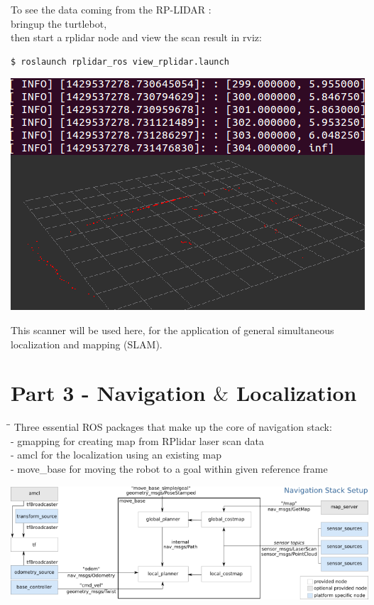 \documentclass[10pt,a4paper]{article}
\begin{document}
To see the data coming from the RP-LIDAR :\\
bringup the turtlebot, \\
then start a rplidar node and view the scan result in rviz:
\begin{lstlisting}[frame=single] 
$ roslaunch rplidar_ros view_rplidar.launch
\end{lstlisting}

\begin{center}
\includegraphics[width=\textwidth]{images/infos+view.png}\\
\end{center}

This scanner will be used here, for the application of general simultaneous localization and mapping (SLAM).

\section{Part 3 - Navigation $\&$ Localization}

\begin{tabbing}
\hspace{1cm}\=\hspace{1cm}\=\kill
Three essential ROS packages that make up the core of navigation stack:	\\
\> - gmapping for creating map from RPlidar laser scan data \\
\> - amcl for the localization using an existing map \\
\> - move\_base for moving the robot to a goal within given reference frame \\
\end{tabbing}

\begin{center}
\includegraphics[width=\textwidth]{images/overview_small.png}
\end{center}
\end{document}
